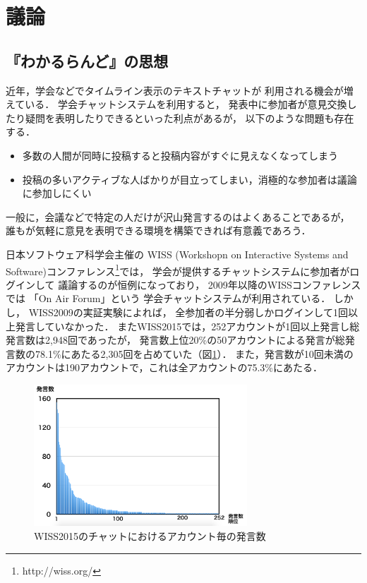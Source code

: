 \section{議論}

\subsection{『わかるらんど』の思想}

近年，学会などでタイムライン表示のテキストチャットが
利用される機会が増えている\cite{goto2012}．
学会チャットシステムを利用すると，
発表中に参加者が意見交換したり疑問を表明したりできるといった利点があるが，
以下のような問題も存在する．

\begin{itemize}
\item 多数の人間が同時に投稿すると投稿内容がすぐに見えなくなってしまう
\item 投稿の多いアクティブな人ばかりが目立ってしまい，消極的な参加者は議論に参加しにくい
\end{itemize}

一般に，会議などで特定の人だけが沢山発言するのはよくあることであるが，
誰もが気軽に意見を表明できる環境を構築できれば有意義であろう．

日本ソフトウェア科学会主催の
WISS (Workshopn on Interactive Systems and Software)コンファレンス\footnote{
  \textsf{http://wiss.org/}
}では，
学会が提供するチャットシステムに参加者がログインして
議論するのが恒例になっており\cite{wiss_challenge}，
2009年以降のWISSコンファレンスでは
「On Air Forum」\cite{nishida2011}という
学会チャットシステムが利用されている．
%
しかし，
WISS2009の実証実験によれば，
全参加者の半分弱しかログインして1回以上発言していなかった．
またWISS2015では，252アカウントが1回以上発言し総発言数は2,948回であったが，
発言数上位20\%の50アカウントによる発言が総発言数の78.1\%にあたる2,305回を占めていた（図\ref{wisschat}）．
また，発言数が10回未満のアカウントは190アカウントで，これは全アカウントの75.3\%にあたる．

\begin{figure}[h]
\centering\includegraphics[width=8cm]{images/wisschat.png}
\caption{WISS2015のチャットにおけるアカウント毎の発言数}
\label{wisschat}
\end{figure}

